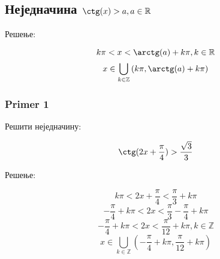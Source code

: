 \documentclass[../diplomski.tex]{subfiles}
\begin{document}
\subsection{Неједначина $\ctg(x)>a,a\in\mathbb{R}$}

Решење:

\[k\pi<x<\arctg(a)+k\pi,k\in\mathbb{R}\]
\[x\in\bigcup_{k\in\mathbb{Z}}\left(k\pi,\arctg(a)+k\pi\right)\]

\subsubsection{Primer 1}

Решити неједначину:

\[\ctg(2x+\frac{\pi}{4})>\frac{\sqrt{3}}{3}\]

Решење:

\[k\pi<2x+\frac{\pi}{4}<\frac{\pi}{3}+k\pi\]
\[-\frac{\pi}{4}+k\pi<2x<\frac{\pi}{3}-\frac{\pi}{4}+k\pi\]
\[-\frac{\pi}{4}+k\pi<2x<\frac{\pi}{12}+k\pi,k\in\mathbb{Z}\]
\[x\in\bigcup_{k\in\mathbb{Z}}\left(-\frac{\pi}{4}+k\pi,\frac{\pi}{12}+k\pi\right)\]
\end{document}
